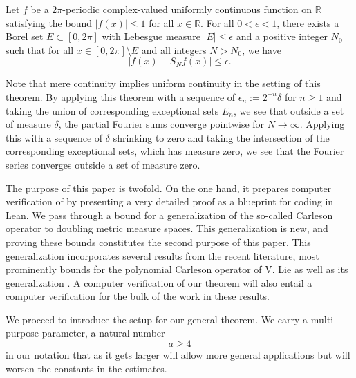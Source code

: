 \begin{theorem}
    \label{classical-Carleson}
    \leanok
    Let $f$ be a $2\pi$-periodic complex-valued uniformly continuous function on $\mathbb{R}$ satisfying the bound $|f(x)|\le 1$ for all $x\in \mathbb{R}$. For all $0<\epsilon<1$, there exists a Borel set $E\subset [0,2\pi]$ with Lebesgue measure $|E|\le \epsilon$ and a positive integer $N_0$ such that for all $x\in [0,2\pi]\setminus E$ and all integers $N>N_0$, we have
    \begin{equation}\label{aeconv}
    |f(x)-S_N f(x)|\le \epsilon.
    \end{equation}
\end{theorem}

Note that mere continuity implies uniform continuity in the setting of this theorem.
By applying this theorem with a sequence of $\epsilon_n:= 2^{-n}\delta$ for $n\ge 1$ and taking the union
of corresponding exceptional sets $E_n$, we see that outside a set of measure $\delta$, the partial Fourier
sums converge pointwise for $N\to \infty$. Applying this with a sequence of $\delta$ shrinking to zero and
taking the intersection of the corresponding exceptional sets, which has measure zero, we see that the Fourier
series converges outside a set of measure zero.

The purpose of this paper is twofold. On the one hand, it prepares computer verification of  by presenting a very detailed proof as a blueprint for coding in Lean. We pass through a bound for a generalization of the so-called Carleson operator to doubling metric measure spaces. This generalization is new, and proving these bounds constitutes the second purpose of this paper. This generalization incorporates several results from the recent literature, most prominently bounds for the polynomial Carleson operator of V. Lie \cite{lie-polynomial} as well as its generalization \cite{zk-polynomial}. A computer verification of our theorem will also entail a computer verification for the bulk of the work in these results.

We proceed to introduce the setup for our general theorem.
We carry a multi purpose parameter, a natural number
\begin{equation}
    a\ge 4
\end{equation} in our notation that as it gets larger will allow more general applications but will worsen the constants in the estimates.




